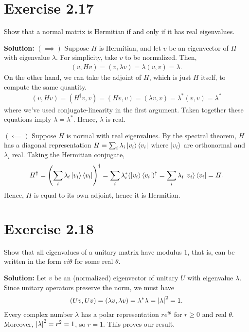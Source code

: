 \documentclass{book}
\begin{document}
\section*{Exercise 2.17}
    Show that a normal matrix is Hermitian if and only if it has real eigenvalues.
    
    \textbf{Solution:} $(\implies)$ Suppose $H$ is Hermitian, and let $v$ be an eigenvector of $H$ with eigenvalue $\lambda$. For simplicity, take $v$ to be normalized. Then,
    \begin{align}
        (v, Hv) = (v, \lambda v) = \lambda (v, v) = \lambda. 
    \end{align}
    On the other hand, we can take the adjoint of $H$, which is just $H$ itself, to compute the same quantity.
    \begin{align}
        (v, Hv) = (H^\dagger v, v) = (Hv,v) = (\lambda v, v) = \lambda^* (v,v) = \lambda^*
    \end{align}
    where we've used conjugate-linearity in the first argument. Taken together these equations imply $\lambda = \lambda^*$. Hence, $\lambda$ is real. 
    
    $(\impliedby)$ Suppose $H$ is normal with real eigenvalues. By the spectral theorem, $H$ has a diagonal representation $H = \sum_i \lambda_i \ket{v_i}\bra{v_i}$ where $\ket{v_i}$ are orthonormal and $\lambda_i$ real. Taking the Hermitian conjugate,
    \begin{align}
        H^\dagger = \left(\sum_i \lambda_i \ket{v_i}\bra{v_i}\right)^\dagger
        = \sum_i \lambda_i^* (\ket{v_i}\bra{v_i})^\dagger = \sum_i \lambda_i \ket{v_i}\bra{v_i} = H.
    \end{align}
    Hence, $H$ is equal to its own adjoint, hence it is Hermitian.
    
\section*{Exercise 2.18}
    Show that all eigenvalues of a unitary matrix have modulus 1, that is, can be written in the form $e{i\theta}$ for some real $\theta$.
    
    \textbf{Solution:} Let $v$ be an (normalized) eigenvector of unitary $U$ with eigenvalue $\lambda$. Since unitary operators preserve the norm, we must have
    \begin{align}
        (Uv, Uv) = (\lambda v, \lambda v) = \lambda^* \lambda = \abs{\lambda}^2 = 1.
    \end{align}
    Every complex number $\lambda$ has a polar representation $r e^{i\theta}$ for $r\geq 0$ and real $\theta$. Moreover, $\abs{\lambda}^2 = r^2 = 1$, so $r = 1$. This proves our result.
    
\end{document}
